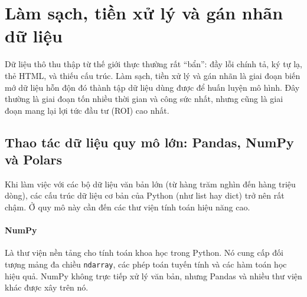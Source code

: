 
\section{Làm sạch, tiền xử lý và gán nhãn dữ liệu}
\label{sec:data_cleaning_labeling}

Dữ liệu thô thu thập từ thế giới thực thường rất “bẩn”: đầy lỗi chính tả, ký tự lạ, thẻ HTML, và thiếu cấu trúc. Làm sạch, tiền xử lý và gán nhãn là giai đoạn biến mớ dữ liệu hỗn độn đó thành tập dữ liệu dùng được để huấn luyện mô hình. Đây thường là giai đoạn tốn nhiều thời gian và công sức nhất, nhưng cũng là giai đoạn mang lại lợi tức đầu tư (ROI) cao nhất.

\subsection{Thao tác dữ liệu quy mô lớn: Pandas, NumPy và Polars}
\label{ssec:data_manipulation_tools}
Khi làm việc với các bộ dữ liệu văn bản lớn (từ hàng trăm nghìn đến hàng triệu dòng), các cấu trúc dữ liệu cơ bản của Python (như list hay dict) trở nên rất chậm. Ở quy mô này cần đến các thư viện tính toán hiệu năng cao.

\paragraph{NumPy}
Là thư viện nền tảng cho tính toán khoa học trong Python. Nó cung cấp đối tượng mảng đa chiều \texttt{ndarray}, các phép toán tuyến tính và các hàm toán học hiệu quả. NumPy không trực tiếp xử lý văn bản, nhưng Pandas và nhiều thư viện khác được xây trên nó.

